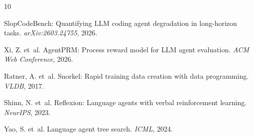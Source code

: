 \documentclass[11pt,a4paper]{article}
\begin{document}

\begin{thebibliography}{10}

SlopCodeBench: Quantifying LLM coding agent degradation in long-horizon tasks.
\textit{arXiv:2603.24755}, 2026.

Xi, Z. et~al.
AgentPRM: Process reward model for LLM agent evaluation.
\textit{ACM Web Conference}, 2026.

Ratner, A. et~al.
Snorkel: Rapid training data creation with data programming.
\textit{VLDB}, 2017.

Shinn, N. et~al.
Reflexion: Language agents with verbal reinforcement learning.
\textit{NeurIPS}, 2023.

Yao, S. et~al.
Language agent tree search.
\textit{ICML}, 2024.

\end{thebibliography}
\end{document}
